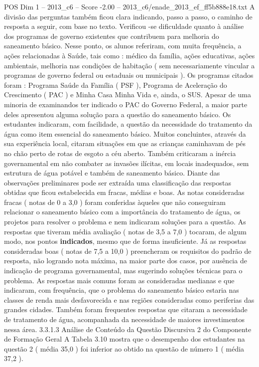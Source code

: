 \begin{textsample}{POS Dim 1 – 2013\_c6 – Score -2.00 – 2013\_c6/enade\_2013\_ef\_ff5b888e18.txt}
A divisão das perguntas também ficou clara indicando, passo a passo, o caminho de resposta a seguir, com base no texto.
Verificou -se dificuldade quanto à análise dos programas de governo existentes que contribuem para melhoria do saneamento básico.
Nesse ponto, os alunos referiram, com muita frequência, a ações relacionadas à Saúde, tais como : médico da família, ações educativas, ações ambientais, melhoria nas condições de habitação ( sem necessariamente vincular a programas de governo federal ou estaduais ou municipais ).
Os programas citados foram : Programa Saúde da Família ( PSF ), Programa de Aceleração do Crescimento ( PAC ) e Minha Casa Minha Vida e, ainda, o SUS.
Apesar de uma minoria de examinandos ter indicado o PAC do Governo Federal, a maior parte deles apresentou alguma solução para a questão do saneamento básico.
Os estudantes indicaram, com facilidade, a questão da necessidade do tratamento da água como item essencial do saneamento básico.
Muitos concluintes, através da sua experiência local, citaram situações em que as crianças caminhavam de pés no chão perto de rotas de esgoto a céu aberto.
Também criticaram a inércia governamental em não combater as invasões ilícitas, em locais inadequados, sem estrutura de água potável e também de saneamento básico.
Diante das observações preliminares pode ser extraída uma classificação das respostas obtidas que ficou estabelecida em fracas, médias e boas.
As notas consideradas fracas ( notas de 0 a 3,0 ) foram conferidas àqueles que não conseguiram relacionar o saneamento básico com a importância do tratamento de água, os projetos para resolver o problema e nem indicaram soluções para a questão.
As respostas que tiveram média avaliação ( notas de 3,5 a 7,0 ) tocaram, de algum modo, nos pontos \textbf{indicados}, mesmo que de forma insuficiente.
Já as respostas consideradas boas ( notas de 7,5 a 10,0 ) preencheram os requisitos do padrão de resposta, não logrando nota máxima, na maior parte dos casos, por ausência de indicação de programa governamental, mas sugerindo soluções técnicas para o problema.
As respostas mais comuns foram as consideradas medianas e que indicaram, com frequência, que o problema do saneamento básico estaria nas classes de renda mais desfavorecida e nas regiões consideradas como periferias das grandes cidades.
Também foram frequentes respostas que citaram a necessidade de tratamento de água, acompanhada da necessidade de maiores investimentos nessa área. 3.3.1.3 Análise de Conteúdo da Questão Discursiva 2 do Componente de Formação Geral A Tabela 3.10 mostra que o desempenho dos estudantes na questão 2 ( média 35,0 ) foi inferior ao obtido na questão de número 1 ( média 37,2 ).

\end{textsample}
